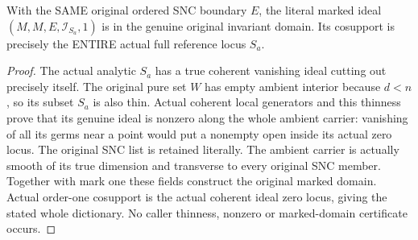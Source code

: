 \begin{theorem}
\label{hir:actual-reference-whole-hs-same-boundary-marked-domain}
\leanok
With the SAME original ordered SNC boundary $E$, the literal marked ideal
$(M,M,E,\mathcal I_{S_a},1)$ is in the genuine original invariant domain.
Its cosupport is precisely the ENTIRE actual full reference locus $S_a$.
\end{theorem}
\begin{proof}
The actual analytic $S_a$ has a true coherent vanishing ideal cutting out
precisely itself. The original pure set $W$ has empty ambient interior
because $d<n$, so its subset $S_a$ is also thin. Actual coherent local
generators and this thinness prove that its genuine ideal is nonzero along
the whole ambient carrier: vanishing of all its germs near a point would
put a nonempty open inside its actual zero locus. The original SNC list
is retained literally. The ambient carrier is actually smooth of its true
dimension and transverse to every original SNC member. Together with mark
one these fields construct the original marked domain. Actual order-one
cosupport is the actual coherent ideal zero locus, giving the stated whole
dictionary. No caller thinness, nonzero or marked-domain certificate occurs.
\end{proof}

